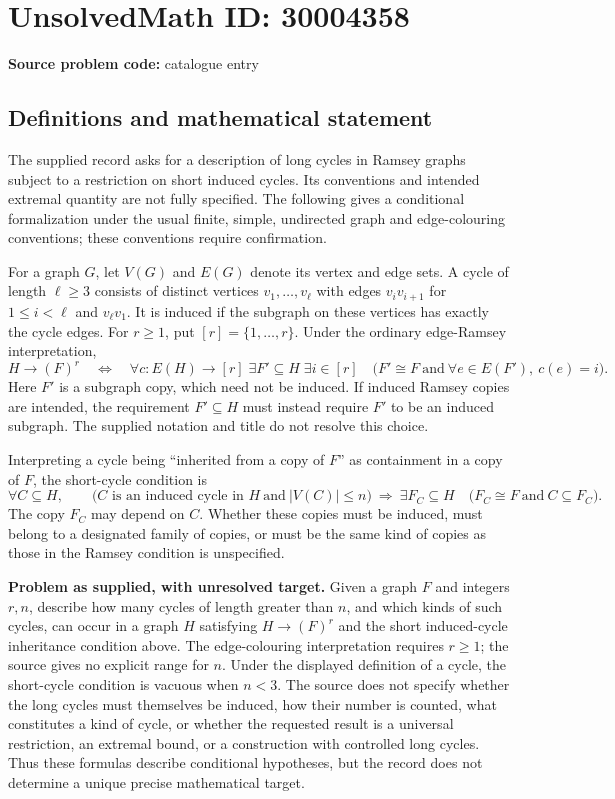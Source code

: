 \documentclass[11pt]{article}
\begin{document}
\section*{UnsolvedMath ID: 30004358}
\textbf{Source problem code:} catalogue entry
\subsection{Definitions and mathematical statement}
The supplied record asks for a description of long cycles in Ramsey graphs subject to a restriction on short induced cycles. Its conventions and intended extremal quantity are not fully specified. The following gives a conditional formalization under the usual finite, simple, undirected graph and edge-colouring conventions; these conventions require confirmation.

For a graph \(G\), let \(V(G)\) and \(E(G)\) denote its vertex and edge sets. A cycle of length \(\ell\geq 3\) consists of distinct vertices \(v_1,\ldots,v_\ell\) with edges \(v_iv_{i+1}\) for \(1\leq i<\ell\) and \(v_\ell v_1\). It is induced if the subgraph on these vertices has exactly the cycle edges. For \(r\geq 1\), put \([r]=\{1,\ldots,r\}\). Under the ordinary edge-Ramsey interpretation,
\[
H\to(F)^r
\quad\Longleftrightarrow\quad
\forall c:E(H)\to[r]\;\exists F'\subseteq H\;\exists i\in[r]\quad
\bigl(F'\cong F\ \text{and}\ \forall e\in E(F'),\ c(e)=i\bigr).
\]
Here \(F'\) is a subgraph copy, which need not be induced. If induced Ramsey copies are intended, the requirement \(F'\subseteq H\) must instead require \(F'\) to be an induced subgraph. The supplied notation and title do not resolve this choice.

Interpreting a cycle being ``inherited from a copy of \(F\)'' as containment in a copy of \(F\), the short-cycle condition is
\[
\forall C\subseteq H,\qquad
\bigl(C\text{ is an induced cycle in }H\ \text{and}\ |V(C)|\leq n\bigr)
\ \Longrightarrow\
\exists F_C\subseteq H\quad
\bigl(F_C\cong F\ \text{and}\ C\subseteq F_C\bigr).
\]
The copy \(F_C\) may depend on \(C\). Whether these copies must be induced, must belong to a designated family of copies, or must be the same kind of copies as those in the Ramsey condition is unspecified.

\textbf{Problem as supplied, with unresolved target.} Given a graph \(F\) and integers \(r,n\), describe how many cycles of length greater than \(n\), and which kinds of such cycles, can occur in a graph \(H\) satisfying \(H\to(F)^r\) and the short induced-cycle inheritance condition above. The edge-colouring interpretation requires \(r\geq1\); the source gives no explicit range for \(n\). Under the displayed definition of a cycle, the short-cycle condition is vacuous when \(n<3\). The source does not specify whether the long cycles must themselves be induced, how their number is counted, what constitutes a kind of cycle, or whether the requested result is a universal restriction, an extremal bound, or a construction with controlled long cycles. Thus these formulas describe conditional hypotheses, but the record does not determine a unique precise mathematical target.
\end{document}
